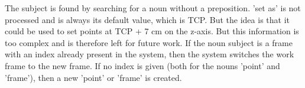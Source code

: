 The subject is found by searching for a noun without a preposition. 'set as' is not processed and is always its default value, which is TCP. But the idea is that it could be used to set points at TCP + 7 cm on the z-axis. But this information is too complex and is therefore left for future work. If the noun subject is a frame with an index already present in the system, then the system switches the work frame to the new frame. If no index is given (both for the nouns 'point' and 'frame'), then a new 'point' or 'frame' is created.
